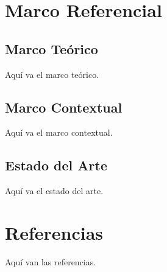 \documentclass[a4paper,12pt]{report}
\begin{document}
\chapter{Marco Referencial}
\section{Marco Teórico}
Aquí va el marco teórico.

\section{Marco Contextual}
Aquí va el marco contextual.

\section{Estado del Arte}
Aquí va el estado del arte.

\chapter{Referencias}
Aquí van las referencias.
\end{document}
